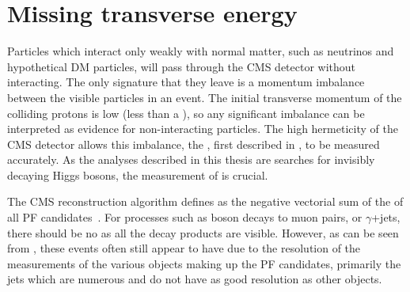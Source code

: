 \section{Missing transverse energy}
\label{sec:MET}
Particles which interact only weakly with normal matter, such as neutrinos and hypothetical \ac{DM} particles, will pass through the CMS detector without interacting. The only signature that they leave is a momentum imbalance between the visible particles in an event. The initial transverse momentum of the colliding protons is low (less than a \GeV), so any significant imbalance can be interpreted as evidence for non-interacting particles. The high hermeticity of the CMS detector allows this imbalance, the \MET, first described in , to be measured accurately. As the analyses described in this thesis are searches for invisibly decaying Higgs bosons, the measurement of \MET is crucial.

The CMS \MET reconstruction algorithm defines \MET as the negative vectorial sum of the \pt of all \ac{PF} candidates~\cite{CMS-PAS-JME-12-002}. For processes such as \PZ boson decays to muon pairs, or $\gamma$+jets, there should be no \MET as all the decay products are visible. However, as can be seen from , these events often still appear to have \MET due to the resolution of the \pt measurements of the various objects making up the \ac{PF} candidates, primarily the jets which are numerous and do not have as good resolution as other objects.

